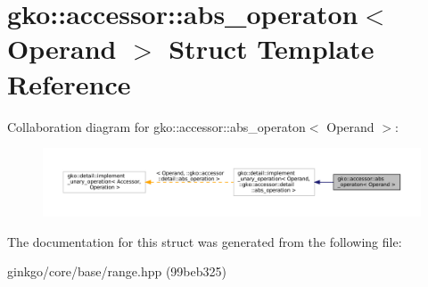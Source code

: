 \hypertarget{structgko_1_1accessor_1_1abs__operaton}{}\section{gko\+:\+:accessor\+:\+:abs\+\_\+operaton$<$ Operand $>$ Struct Template Reference}
\label{structgko_1_1accessor_1_1abs__operaton}


Collaboration diagram for gko\+:\+:accessor\+:\+:abs\+\_\+operaton$<$ Operand $>$\+:
\nopagebreak
\begin{figure}[H]
\begin{center}
\leavevmode
\includegraphics[width=350pt]{structgko_1_1accessor_1_1abs__operaton__coll__graph}
\end{center}
\end{figure}


The documentation for this struct was generated from the following file\+:\begin{DoxyCompactItemize}
\item 
ginkgo/core/base/range.\+hpp (99beb325)\end{DoxyCompactItemize}
